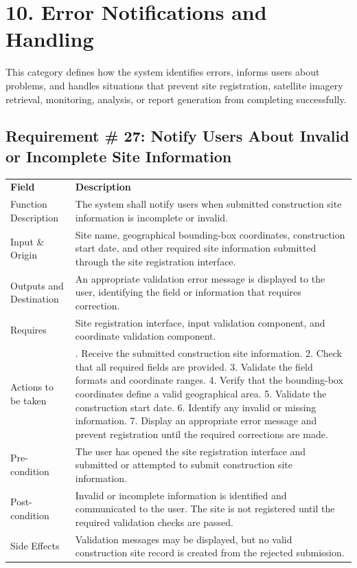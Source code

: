 \documentclass[12pt,a4paper]{report}
\begin{document}
\section{10. Error Notifications and
Handling}\label{error-notifications-and-handling-1}

This category defines how the system identifies errors, informs users
about problems, and handles situations that prevent site registration,
satellite imagery retrieval, monitoring, analysis, or report generation
from completing successfully.

\subsection{Requirement \# 27: Notify Users About Invalid or
Incomplete Site
Information}\label{requirement-32-notify-users-about-invalid-or-incomplete-site-information}

\begin{longtable}[]{@{}
  >{\raggedright\arraybackslash}p{}
  >{\raggedright\arraybackslash}p{}@{}}
\toprule\noalign{}
\endhead
\bottomrule\noalign{}
\endlastfoot
\textbf{Field} & \textbf{Description} \\
Function Description & The system shall notify users when submitted
construction site information is incomplete or invalid. \\
Input \& Origin & Site name, geographical bounding-box coordinates,
construction start date, and other required site information submitted
through the site registration interface. \\
Outputs and Destination & An appropriate validation error message is
displayed to the user, identifying the field or information that
requires correction. \\
Requires & Site registration interface, input validation component, and
coordinate validation component. \\
Actions to be taken & 1. Receive the submitted construction site
information. 2. Check that all required fields are provided. 3. Validate
the field formats and coordinate ranges. 4. Verify that the bounding-box
coordinates define a valid geographical area. 5. Validate the
construction start date. 6. Identify any invalid or missing information.
7. Display an appropriate error message and prevent registration until
the required corrections are made. \\
Pre-condition & The user has opened the site registration interface and
submitted or attempted to submit construction site information. \\
Post-condition & Invalid or incomplete information is identified and
communicated to the user. The site is not registered until the required
validation checks are passed. \\
Side Effects & Validation messages may be displayed, but no valid
construction site record is created from the rejected submission. \\
\end{longtable}
\end{document}
